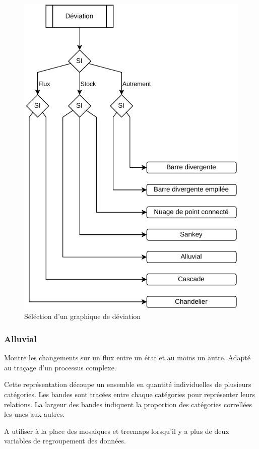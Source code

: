 \documentclass[a4paper,12pt]{article}
\begin{document}
\begin{multicols}{2}
\begin{figure}[H]
\centering
\includegraphics[width=.9\linewidth]{./img/select-deviation.pdf}
\caption{\label{fig:orgda18caf}Séléction d'un graphique de déviation}
\end{figure}
\subsubsection*{Alluvial}
\label{sec:orgf6cc1f8}

Montre les changements sur un flux entre un état et au moins un autre. Adapté au traçage d'un processus complexe. \autocite{alansmithLexiqueVisuel}

Cette représentation découpe un ensemble en quantité individuelles de plusieurs catégories. Les bandes sont tracées entre chaque catégories pour représenter leurs relations. La largeur des bandes indiquent la proportion des catégories correllées les unes aux autres. \autocite{wilkeVisualizingNestedProportions2019}

A utiliser à la place des mosaiques et treemaps lorsqu'il y a plus de deux variables de regroupement des données. \autocite{wilkeDirectoryVisualizations2019}

\end{multicols}
\end{document}
